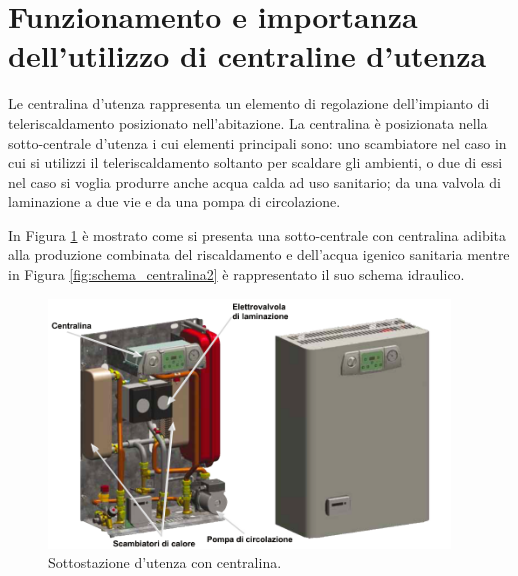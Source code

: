 \documentclass[laurea,oneside,11pt]{USiena_tesiLM}
\begin{document}


\section{Funzionamento e importanza dell'utilizzo di centraline d'utenza}
\label{sec:centraline}
Le centralina d'utenza rappresenta un elemento di regolazione dell'impianto di teleriscaldamento posizionato nell'abitazione. La centralina è posizionata nella sotto-centrale d'utenza i cui elementi principali sono: uno scambiatore nel caso in cui si utilizzi il teleriscaldamento soltanto per scaldare gli ambienti, o due di essi nel caso si voglia produrre anche acqua calda ad uso sanitario; da una valvola di laminazione a due vie e da una pompa di circolazione. 

In Figura \ref{fig:centralina} è mostrato come si presenta una sotto-centrale con centralina adibita alla produzione combinata del riscaldamento e dell'acqua igenico sanitaria mentre in Figura \ref{fig:schema_centralina2} è rappresentato il suo schema idraulico.

\begin{figure}[!ht]
\centering
\includegraphics[width=0.95\textwidth]{figure/centralina} 
\caption{Sottostazione d'utenza con centralina.}
\label{fig:centralina}
\end{figure}
\end{document}
